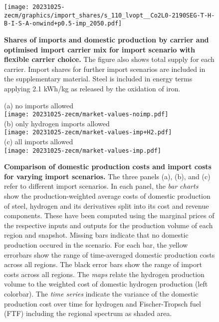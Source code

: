 \begin{figure}%
    \texttt{[image: 20231025-zecm/graphics/import\_shares/s\_110\_lvopt\_\_Co2L0-2190SEG-T-H-B-I-S-A-onwind+p0.5-imp\_2050.pdf]}
    \caption{\textbf{Shares of imports and domestic production by carrier and optimised import carrier mix for import scenario with flexible carrier choice.}
        The figure also shows total supply for each carrier. Import shares for
        further import scenarios are included in the supplementary material.
        Steel is included in energy terms applying 2.1 kWh/kg as released by the
        oxidation of iron. }
    \label{fig:import-shares}
\end{figure}

\begin{figure*}
    \centering
    \footnotesize
    (a) no imports allowed \\
    \texttt{[image: 20231025-zecm/market-values-noimp.pdf]} \\
    (b) only hydrogen imports allowed \\
    \texttt{[image: 20231025-zecm/market-values-imp+H2.pdf]} \\
    (c) all imports allowed \\
    \texttt{[image: 20231025-zecm/market-values-imp.pdf]}
    \caption{\textbf{Comparison of domestic production costs and import costs for varying import scenarios.}
        The three panels (a), (b), and (c) refer to different import scenarios.
        In each panel, the \textit{bar charts} show the production-weighted
        average costs of domestic production of steel, hydrogen and its
        derivatives split into its cost and revenue components. These have been
        computed using the marginal prices of the respective inputs and outputs
        for the production volume of each region and snapshot. Missing bars
        indicate that no domestic production occured in the scenario. For each
        bar, the yellow errorbars show the range of time-averaged domestic
        production costs across all regions. The black error bars show the range
        of import costs across all regions. The \textit{maps} relate the
        hydrogen production volume to the weighted cost of domestic hydrogen
        production (left colorbar). The \textit{time series} indicate the
        variance of the domestic production cost over time for hydrogen and
        Fischer-Tropsch fuel (FTF) including the regional spectrum as shaded area.}
    \label{fig:market-values}
\end{figure*}

